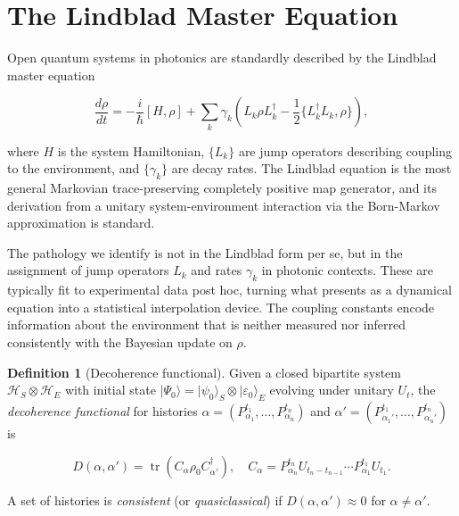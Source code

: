 \documentclass[11pt, openright, twoside]{book}
\theoremstyle{plain}
\theoremstyle{definition}
\newtheorem{definition}[theorem]{Definition}
\theoremstyle{remark}
\begin{document}
\section{The Lindblad Master Equation}

Open quantum systems in photonics are standardly described by the Lindblad master equation

\begin{equation}
  \frac{d\rho}{dt} = -\frac{i}{\hbar}[H, \rho]
  + \sum_k \gamma_k \left(L_k \rho L_k^\dagger
  - \frac{1}{2}\{L_k^\dagger L_k, \rho\}\right),
  \label{eq:lindblad}
\end{equation}

where $H$ is the system Hamiltonian, $\{L_k\}$ are jump operators describing coupling to
the environment, and $\{\gamma_k\}$ are decay rates. The Lindblad equation is the most
general Markovian trace-preserving completely positive map generator, and its derivation
from a unitary system-environment interaction via the Born-Markov approximation is
standard.

The pathology we identify is not in the Lindblad form per se, but in the assignment of
jump operators $L_k$ and rates $\gamma_k$ in photonic contexts. These are typically fit
to experimental data post hoc, turning what presents as a dynamical equation into a
statistical interpolation device. The coupling constants encode information about the
environment that is neither measured nor inferred consistently with the Bayesian update
on $\rho$.

\begin{definition}[Decoherence functional]
\label{def:decoherence_functional}
Given a closed bipartite system $\mathcal{H}_S \otimes \mathcal{H}_E$ with initial state
$|\Psi_0\rangle = |\psi_0\rangle_S \otimes |\varepsilon_0\rangle_E$ evolving under unitary
$U_t$, the \emph{decoherence functional} for histories
$\alpha = (P_{\alpha_1}^{t_1}, \ldots, P_{\alpha_n}^{t_n})$ and
$\alpha' = (P_{\alpha_1'}^{t_1}, \ldots, P_{\alpha_n'}^{t_n})$ is

\begin{equation}
  D(\alpha, \alpha') = \operatorname{tr}\!\left(
  C_\alpha \rho_0 C_{\alpha'}^\dagger
  \right),
  \quad C_\alpha = P_{\alpha_n}^{t_n} U_{t_n - t_{n-1}} \cdots P_{\alpha_1}^{t_1} U_{t_1}.
  \label{eq:decoherence_functional}
\end{equation}

A set of histories is \emph{consistent} (or \emph{quasiclassical}) if
$D(\alpha, \alpha') \approx 0$ for $\alpha \neq \alpha'$.
\end{definition}
\end{document}
